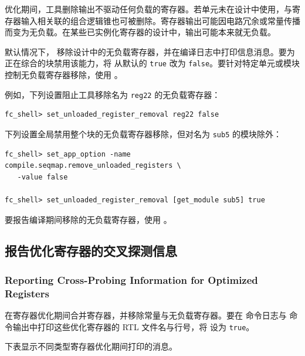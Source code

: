 优化期间，工具删除输出不驱动任何负载的寄存器。若单元未在设计中使用，与寄存器输入相关联的组合逻辑锥也可被删除。寄存器输出可能因电路冗余或常量传播而变为无负载。在某些已实例化寄存器的设计中，输出可能本来就无负载。

默认情况下， 移除设计中的无负载寄存器，并在编译日志中打印信息消息。要为正在综合的块禁用该能力，将  从默认的 \texttt{true} 改为 \texttt{false}。要针对特定单元或模块控制无负载寄存器移除，使用 。

例如，下列设置阻止工具移除名为 \texttt{reg22} 的无负载寄存器：
\begin{lstlisting}
fc_shell> set_unloaded_register_removal reg22 false
\end{lstlisting}

下列设置全局禁用整个块的无负载寄存器移除，但对名为 \texttt{sub5} 的模块除外：
\begin{lstlisting}
fc_shell> set_app_option -name compile.seqmap.remove_unloaded_registers \
   -value false

fc_shell> set_unloaded_register_removal [get_module sub5] true
\end{lstlisting}

要报告编译期间移除的无负载寄存器，使用 。

\subsection{报告优化寄存器的交叉探测信息}
\subsubsection*{Reporting Cross-Probing Information for Optimized Registers}

 在寄存器优化期间合并寄存器，并移除常量与无负载寄存器。要在  命令日志与  命令输出中打印这些优化寄存器的 RTL 文件名与行号，将  设为 \texttt{true}。

下表显示不同类型寄存器优化期间打印的消息。

